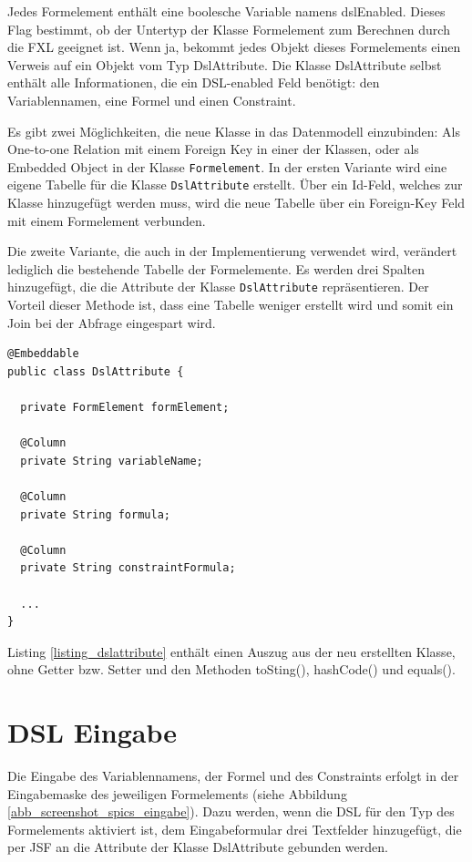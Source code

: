 Jedes Formelement enthält eine boolesche Variable namens dslEnabled. Dieses Flag bestimmt, ob der Untertyp der Klasse Formelement zum Berechnen durch die FXL geeignet ist. Wenn ja, bekommt jedes Objekt dieses Formelements einen Verweis auf ein Objekt vom Typ DslAttribute. Die Klasse DslAttribute selbst enthält alle Informationen, die ein DSL-enabled Feld benötigt: den Variablennamen, eine Formel und einen Constraint. 

Es gibt zwei Möglichkeiten, die neue Klasse in das Datenmodell einzubinden: Als One-to-one Relation mit einem Foreign Key in einer der Klassen, oder als Embedded Object in der Klasse \texttt{Formelement}. In der ersten Variante wird eine eigene Tabelle für die Klasse \texttt{DslAttribute} erstellt. Über ein Id-Feld, welches zur Klasse hinzugefügt werden muss, wird die neue Tabelle über ein Foreign-Key Feld mit einem Formelement verbunden.

Die zweite Variante, die auch in der Implementierung verwendet wird, verändert lediglich die bestehende Tabelle der Formelemente. Es werden drei Spalten hinzugefügt, die die Attribute der Klasse \texttt{DslAttribute} repräsentieren. Der Vorteil dieser Methode ist, dass eine Tabelle weniger erstellt wird und somit ein Join bei der Abfrage eingespart wird.

\begin{lstlisting}[float = htbp,caption={Embedded DslAttribute },label=listing_dslattribute]
@Embeddable
public class DslAttribute {

  private FormElement formElement;
  
  @Column
  private String variableName;

  @Column
  private String formula;

  @Column
  private String constraintFormula;

  ...
}
\end{lstlisting}


Listing \ref{listing_dslattribute} enthält einen Auszug aus der neu erstellten Klasse, ohne Getter bzw. Setter und den Methoden toSting(), hashCode() und equals().

\section{DSL Eingabe}
\label{implementierung_dsl_eingabe}

Die Eingabe des Variablennamens, der Formel und des Constraints erfolgt in der Eingabemaske des jeweiligen Formelements (siehe Abbildung \ref{abb_screenshot_spics_eingabe}). Dazu werden, wenn die DSL für den Typ des Formelements aktiviert ist, dem Eingabeformular drei Textfelder hinzugefügt, die per JSF an die Attribute der Klasse DslAttribute gebunden werden.


